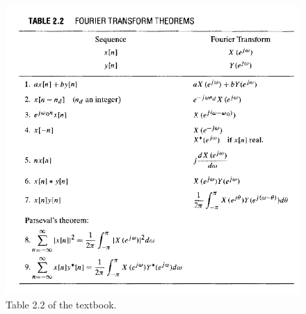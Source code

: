 \documentclass[12pt]{report}
\begin{document}
\begin{figure}[h!]
	\centering
	\includegraphics{figs/table22.png}
	\caption{Table 2.2 of the textbook.}
\end{figure}
\end{document}
